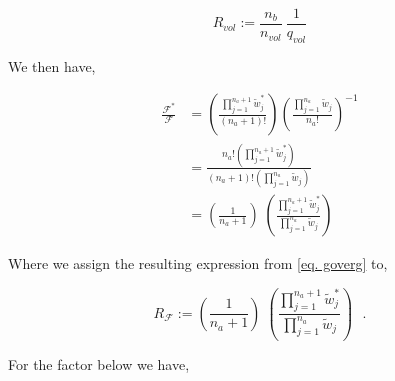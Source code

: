 \documentclass[12pt,letterpaper]{article}
\newcommand{\leng}{\mathcal{L}}
\newcommand{\lr}[1]{\left( #1 \right)}
\newcommand{\fop}{\ensuremath{\mathcal{F}}}
\begin{document}
\begin{equation}
    R_{vol}:=
    		\frac{
		    n_b
		}{
		    n_{vol} 
		}
		~
    \frac{
    1
}{
    q_{vol}
}
   \label{Rvol}
\end{equation}

We then have,

\begin{align}
\label{eq. goverg}
\frac{
    \fop^{*}
}{
    \fop
}
&=
\lr{
    \frac{
        \prod_{j=1}^{n_a+1}\tilde{w}^{*}_j
    }{
        (n_a+1)!
    }
}
\lr{   
    \frac{
       \prod_{j=1}^{n_a}\tilde{w}_j
    }{
        n_a!
    }   
}^{-1}\nonumber\\
&=
\frac{
        n_a!
        \lr{
            \prod_{j=1}^{n_a+1}\tilde{w}^{*}_j
        }       
}{ 
        (n_a+1)!
        \lr{
            \prod_{j=1}^{n_a}\tilde{w}_j
        }
}\\
&=
\lr{
    \frac{1}{n_a+1}
}
\;
\lr{
    \frac{
    \displaystyle
        \prod_{j=1}^{n_a+1}\tilde{w}^{*}_j
    }{
    \displaystyle
        \prod_{j=1}^{n_a}\tilde{w}_j
    }
}
\end{align}

Where we assign the resulting expression from \ref{eq. goverg} to,

\begin{equation}
    R_{\fop}:=
    \lr{
    \frac{1}{n_a+1}
}
\;
\lr{
    \frac{
    \displaystyle
        \prod_{j=1}^{n_a+1}\tilde{w}^{*}_j
    }{
    \displaystyle
        \prod_{j=1}^{n_a}\tilde{w}_j
    }
}~~~\textbf{.}
   \label{Eq: RG}
\end{equation}



For the factor below we have, 
\end{document}
